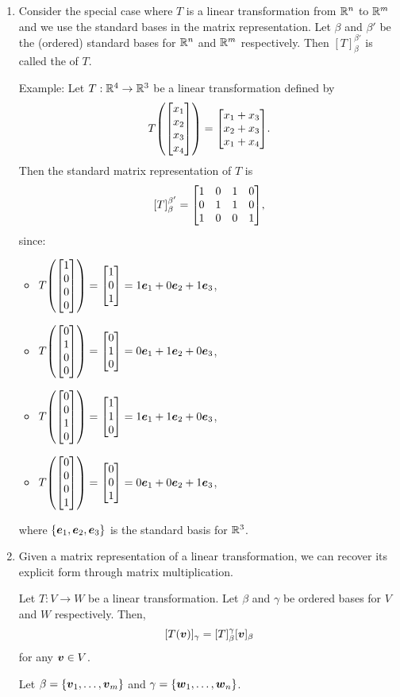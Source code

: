 \begin{enumerate}
\item Consider the special case where \(T\) is a linear transformation from
\(\mathbb{R}^n\) to \(\mathbb{R}^m\) and we use the standard bases in the matrix
representation. Let \(\beta\) and \(\beta'\) be the (ordered) standard bases
for \(\mathbb{R}^n\) and \(\mathbb{R}^m\) respectively. Then \([T]_{\beta}^{\beta'}\) is called
the  of \(T\).

Example: Let \(T:\mathbb{R}^4\to\mathbb{R}^3\) be a linear transformation defined by
\[
T\qty(\mqty[x_1\\ x_2\\ x_3\\ x_4])=\mqty[x_1+x_3\\ x_2+x_3\\ x_1+x_4].
\]
Then the standard matrix representation of \(T\) is
\[
[T]_{\beta}^{\beta'}=\mqty[1&0&1&0\\ 0&1&1&0\\ 1&0&0&1],
\]
since:
\begin{itemize}
\item \(\displaystyle T\qty(\mqty[1\\ 0\\ 0\\ 0])=\mqty[1\\ 0\\
1]=1\vect{e}_1+0\vect{e}_2+1\vect{e}_3\),
\item \(\displaystyle T\qty(\mqty[0\\ 1\\ 0\\ 0])=\mqty[0\\ 1\\
0]=0\vect{e}_1+1\vect{e}_2+0\vect{e}_3\),
\item \(\displaystyle T\qty(\mqty[0\\ 0\\ 1\\ 0])=\mqty[1\\ 1\\
0]=1\vect{e}_1+1\vect{e}_2+0\vect{e}_3\),
\item \(\displaystyle T\qty(\mqty[0\\ 0\\ 0\\ 1])=\mqty[0\\ 0\\
1]=0\vect{e}_1+0\vect{e}_2+1\vect{e}_3\),
\end{itemize}
where \(\{\vb*{e}_1,\vb*{e}_2,\vb*{e}_3\}\) is the standard basis for \(\mathbb{R}^3\).

\item Given a matrix representation of a linear transformation, we can recover
its explicit form through matrix multiplication.
\begin{theorem}
\label{thm:matx-rep-matx-mult}
Let \(T:V\to W\) be a linear transformation. Let \(\beta\) and \(\gamma\) be
ordered bases for \(V\) and \(W\) respectively. Then,
\[
[T(\vb*{v})]_{\gamma}=[T]_{\beta}^{\gamma}[\vb*{v}]_{\beta}
\]
for any \(\vb*{v}\in V\).
\end{theorem}
\begin{pf}
Let \(\beta=\{\vb*{v}_1,\dotsc,\vb*{v}_m\}\) and
\(\gamma=\{\vb*{w}_1,\dotsc,\vb*{w}_n\}\).


\end{pf}
\end{enumerate}
